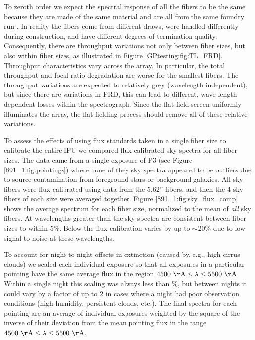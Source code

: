 To zeroth order we expect the spectral response of all the \GP fibers
to be the same because they are made of the same material and are all
from the same foundry run \citep{Wood12}. In reality the \GP fibers
come from different draws, were handled differently during
construction, and have different degrees of termination quality.
Consequently, there are throughput variations not only between fiber
sizes, but also within fiber sizes, as illustrated in Figure
\ref{GPtesting:fig:TL_FRD}.  Throughput characteristics vary across the \GP
array. In particular, the total throughput and focal ratio degradation
are worse for the smallest fibers. The throughput variations are
expected to relatively grey (wavelength independent), but since there
are variations in FRD, this can lead to different, wave-length
dependent losses within the spectrograph. Since the flat-field screen
uniformly illuminates the array, the flat-fielding process should
remove all of these relative variations.

To assess the effects of using flux standards taken in a single fiber
size to calibrate the entire \GP IFU we compared flux calibrated sky
spectra for all fiber sizes. The data came from a single exposure of
P3 (see Figure \ref{891_1:fig:pointings}) where none of they sky spectra
appeared to be outliers due to source contamination from foreground
stars or background galaxies.  All sky fibers were flux calibrated
using data from the 5.62'' fibers, and then the 4 sky fibers of each
size were averaged together. Figure \ref{891_1:fig:sky_flux_comp} shows the
average spectrum for each fiber size, normalized to the mean of
\emph{all} sky fibers. At wavelengths greater than  the
sky spectra are consistent between fiber sizes to within 5\%. Below
 the flux calibration varies by up to ${\sim}$20\% due
to low signal to noise at these wavelengths.


To account for night-to-night offsets in extinction (caused by, e.g.,
high cirrus clouds) we scaled each individual exposure so that all
exposures in a particular pointing have the same average flux in the
region $\val{4500}{\AA} \leq \lambda \leq \val{5500}{\AA}$. Within a
single night this scaling was always less than \%, but between
nights it could vary by a factor of up to 2 in cases where a night had
poor observation conditions (high humidity, persistent clouds,
etc.). The final spectra for each pointing are an average of
individual exposures weighted by the square of the inverse of their
deviation from the mean pointing flux in the range $\val{4500}{\AA}
\leq \lambda \leq \val{5500}{\AA}$.

